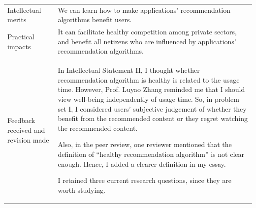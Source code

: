 \begin{table}[H]
\begin{tabularx}{\textwidth}{@{}p{}Y@{}}
Intellectual merits & We can learn how to make applications’ recommendation algorithms benefit users.\\
Practical impacts & It can facilitate healthy competition among private sectors, and benefit all netizens who are influenced by applications’ recommendation algorithms.\\
Feedback received and revision made & In Intellectual Statement II, I thought whether recommendation algorithm is healthy is related to the usage time. However, Prof. Luyao Zhang reminded me that I should view well-being independently of usage time. So, in problem set I, I considered users’ subjective judgement of whether they benefit from the recommended content or they regret watching the recommended content.\par Also, in the peer review, one reviewer mentioned that the definition of “healthy recommendation algorithm” is not clear enough. Hence, I added a clearer definition in my essay.\par I retained three current research questions, since they are worth studying.\\
\bottomrule\end{tabularx}\end{table}
